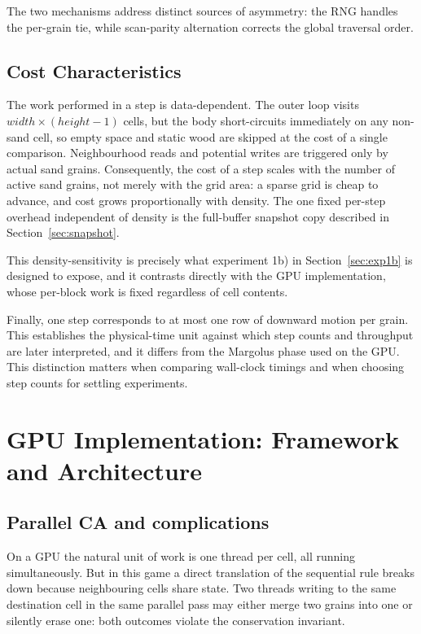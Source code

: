 \documentclass[oneside, a4paper, onecolumn, 11pt]{article}
\begin{document}
The two mechanisms address distinct sources of asymmetry: the RNG handles the per-grain tie, while scan-parity alternation corrects the global traversal order.

\subsection{Cost Characteristics}

The work performed in a step is data-dependent.
The outer loop visits $\mathit{width} \times (\mathit{height}-1)$ cells, but the body short-circuits immediately on any non-sand cell, so empty space and static wood are skipped at the cost of a single comparison.
Neighbourhood reads and potential writes are triggered only by actual sand grains.
Consequently, the cost of a step scales with the number of active sand grains, not merely with the grid area: a sparse grid is cheap to advance, and cost grows proportionally with density.
The one fixed per-step overhead independent of density is the full-buffer snapshot copy described in Section~\ref{sec:snapshot}.

This density-sensitivity is precisely what experiment 1b) in Section~\ref{sec:exp1b} is designed to expose, and it contrasts directly with the GPU implementation, whose per-block work is fixed regardless of cell contents.

Finally, one step corresponds to at most one row of downward motion per grain.
This establishes the physical-time unit against which step counts and throughput are later interpreted, and it differs from the Margolus phase used on the GPU. This distinction matters when comparing wall-clock timings and when choosing step counts for settling experiments.


\section{GPU Implementation: Framework and Architecture}

\subsection{Parallel CA and complications}

On a GPU the natural unit of work is one thread per cell, all running simultaneously. But in this game a direct translation of the sequential rule breaks down because neighbouring cells share state.
Two threads writing to the same destination cell in the same parallel pass may either merge two grains into one or silently erase one: both outcomes violate the conservation invariant.
\end{document}
